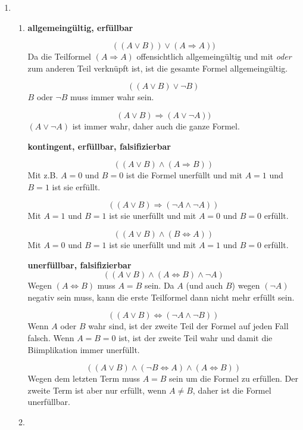 \documentclass[a4paper,10pt]{scrartcl}
\title{\titleinfo}
\author{Arne Feil}
\date{\today}
\newcommand{\aufgabe}[1]{\item[\textbf{#1}]}
\begin{document}
\begin{enumerate}

\aufgabe{6.3}
\begin{enumerate}[1.]
 \item

  \textbf{allgemeingültig, erfüllbar}

  $$((A\vee B))\vee (A\Rightarrow A))$$
  Da die Teilformel $(A\Rightarrow A)$ offensichtlich allgemeingültig und mit \textit{oder} zum anderen Teil verknüpft ist, ist die gesamte Formel allgemeingültig.

  $$((A\vee B)\vee\neg B)$$
  $B$ oder $\neg B$ muss immer wahr sein.

  $$(A\vee B)\Rightarrow(A\vee\neg A))$$
  $(A\vee\neg A)$ ist immer wahr, daher auch die ganze Formel.

  \textbf{kontingent, erfüllbar, falsifizierbar}

  $$((A\vee B)\wedge(A\Rightarrow B))$$
  Mit z.B. $A=0$ und $B=0$ ist die Formel unerfüllt und mit $A=1$ und $B=1$ ist sie erfüllt.

  $$((A\vee B)\Rightarrow(\neg A\wedge \neg A))$$
  Mit $A=1$ und $B=1$ ist sie unerfüllt und mit $A=0$ und $B=0$ erfüllt.

  $$((A\vee B)\wedge(B\Leftrightarrow A))$$
  Mit $A=0$ und $B=1$ ist sie unerfüllt und mit $A=1$ und $B=0$ erfüllt.

  \textbf{unerfüllbar, falsifizierbar}
  $$((A\vee B)\wedge(A\Leftrightarrow B)\wedge\neg A)$$
  Wegen $(A\Leftrightarrow B)$ muss $A=B$ sein. Da $A$ (und auch $B$) wegen $(\neg A)$ negativ sein muss, kann die erste Teilformel dann nicht mehr erfüllt sein.

  $$((A\vee B)\Leftrightarrow(\neg A\wedge\neg B))$$
  Wenn $A$ oder $B$ wahr sind, ist der zweite Teil der Formel auf jeden Fall falsch. Wenn $A=B=0$ ist, ist der zweite Teil wahr und damit die Biimplikation immer unerfüllt.

  $$((A\vee B)\wedge(\neg B\Leftrightarrow A)\wedge(A\Leftrightarrow B))$$
  Wegen dem letzten Term muss $A=B$ sein um die Formel zu erfüllen. Der zweite Term ist aber nur erfüllt, wenn $A\neq B$, daher ist die Formel unerfüllbar.

  \item


\end{enumerate}
\end{enumerate}
\end{document}
